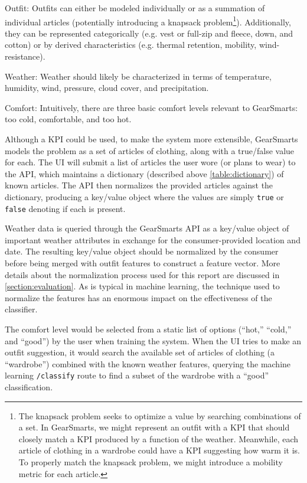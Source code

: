 \begin{description}
  \item{Outfit:} Outfits can either be modeled individually or as a summation of individual articles (potentially introducing
  a knapsack problem\footnote{The knapsack problem seeks to optimize a value by searching combinations of a set. In GearSmarts,
  we might represent an outfit with a KPI that should closely match a KPI produced by a function of the weather. Meanwhile, each
  article of clothing in a wardrobe could have a KPI suggesting how warm it is. To properly match the knapsack problem, we might
  introduce a mobility metric for each article.}).
  Additionally, they can be represented categorically (e.g. vest or full-zip and
  fleece, down, and cotton) or by derived characteristics (e.g. thermal retention, mobility, wind-resistance).
  \item{Weather:} Weather should likely be characterized in terms of temperature, humidity, wind, pressure,
  cloud cover, and precipitation.
  \item{Comfort:} Intuitively, there are three basic comfort levels relevant to GearSmarts: too cold, comfortable, and too hot.
\end{description}

Although a KPI could be used, to make the system more extensible, GearSmarts models the problem as a set of
articles of clothing, along with a true/false value for each. The UI will submit a list of articles the user wore (or
plans to wear) to the API, which maintains a dictionary (described above \ref{table:dictionary}) of known articles. The
API then normalizes the provided articles against the dictionary, producing a key/value object where the values are
simply \texttt{true} or \texttt{false} denoting if each is present.

Weather data is queried through the GearSmarts API as a key/value object of important
weather attributes in exchange for the consumer-provided location and date. The resulting key/value object should be
normalized by the consumer before being merged with outfit features to construct a feature vector. More details about
the normalization process used for this report are discussed in \ref{section:evaluation}. As is typical in
machine learning, the technique used to normalize the features has an enormous impact on the effectiveness of the
classifier.

The comfort level would be selected from a static list of options (``hot,'' ``cold,'' and ``good'') by the user when
training the system. When the UI tries to make an outfit suggestion, it would search the available set of articles of
clothing (a ``wardrobe'') combined with the known weather features, querying the machine learning \texttt{/classify}
route to find a subset of the wardrobe with a ``good'' classification.
